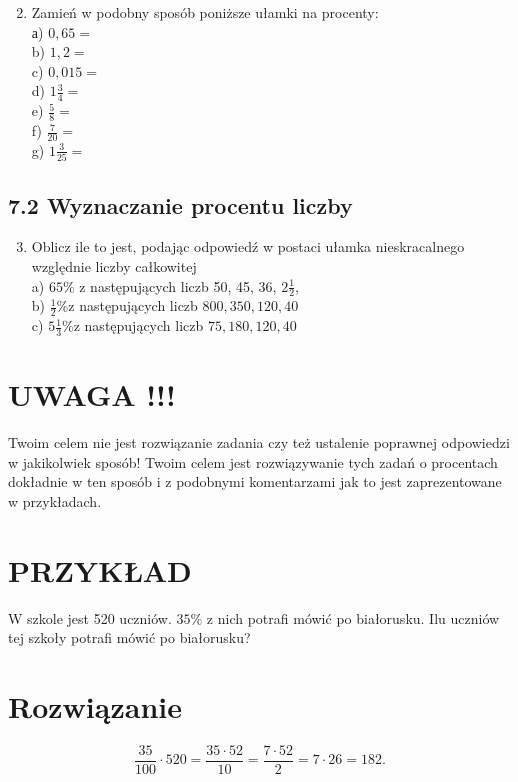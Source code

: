 \documentclass[10pt]{article}
\begin{document}
\begin{enumerate}
  \setcounter{enumi}{1}
  \item Zamień w podobny sposób poniższe ułamki na procenty:\\
а) \(0,65=\)\\
b) \(1,2=\)\\
c) \(0,015=\)\\
d) \(1 \frac{3}{4}=\)\\
e) \(\frac{5}{8}=\)\\
f) \(\frac{7}{20}=\)\\
g) \(1 \frac{3}{25}=\)
\end{enumerate}

\subsection*{7.2 Wyznaczanie procentu liczby}
\begin{enumerate}
  \setcounter{enumi}{2}
  \item Oblicz ile to jest, podając odpowiedź w postaci ułamka nieskracalnego względnie liczby całkowitej\\
a) \(65 \%\) z następujących liczb 50, 45, 36, \(2 \frac{1}{2}\),\\
b) \(\frac{1}{2} \% \mathrm{z}\) następujących liczb \(800,350,120,40\)\\
c) \(5 \frac{1}{3} \% \mathrm{z}\) następujących liczb \(75,180,120,40\)
\end{enumerate}

\section*{UWAGA !!!}
Twoim celem nie jest rozwiązanie zadania czy też ustalenie poprawnej odpowiedzi w jakikolwiek sposób! Twoim celem jest rozwiązywanie tych zadań o procentach dokładnie w ten sposób i z podobnymi komentarzami jak to jest zaprezentowane w przykładach.

\section*{PRZYKŁAD}
W szkole jest 520 uczniów. \(35 \%\) z nich potrafi mówić po białorusku. Ilu uczniów tej szkoły potrafi mówić po białorusku?

\section*{Rozwiązanie}
\[
\frac{35}{100} \cdot 520=\frac{35 \cdot 52}{10}=\frac{7 \cdot 52}{2}=7 \cdot 26=182 .
\]
\end{document}
